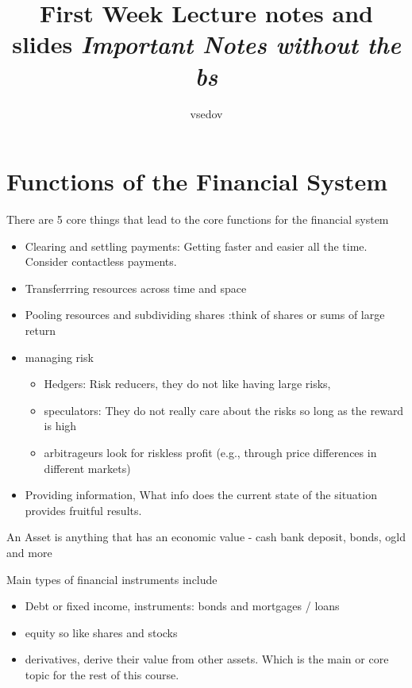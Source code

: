 \documentclass{article}
\title{First Week Lecture notes and slides \textit{Important Notes without the bs}}
\author{vsedov}
\theoremstyle{mytheoremstyle}
\theoremstyle{mytheoremstyle}
\theoremstyle{myproblemstyle}
\begin{document}
\maketitle

\tableofcontents
\newpage

\section{Functions of the Financial System}
There are 5 core things that lead to the core functions for the financial system

\begin{itemize}
	\item Clearing and settling payments: Getting faster and easier all the time. Consider contactless payments.
	\item Transferrring resources across time and space
	\item Pooling resources and subdividing shares :think of shares or sums of large return
	\item managing risk
	      \begin{itemize}
		      \item Hedgers: Risk reducers, they do not like having large risks,
		      \item speculators: They do not really care about the risks so long as the reward is high
		      \item arbitrageurs look for riskless profit (e.g., through price
		            differences in different markets)
	      \end{itemize}
	\item Providing information, What info does the current state of the situation provides fruitful results.
\end{itemize}

\begin{definition}[Assets]
	An Asset is anything that has an economic value - cash bank deposit, bonds, ogld and more

	Main types of financial instruments include
	\begin{itemize}
		\item Debt or fixed income, instruments: bonds and mortgages / loans
		\item equity so like shares and stocks
		\item derivatives, derive their value from other assets. Which is the main or core topic for the rest of this course.
	\end{itemize}
\end{definition}
\end{document}
